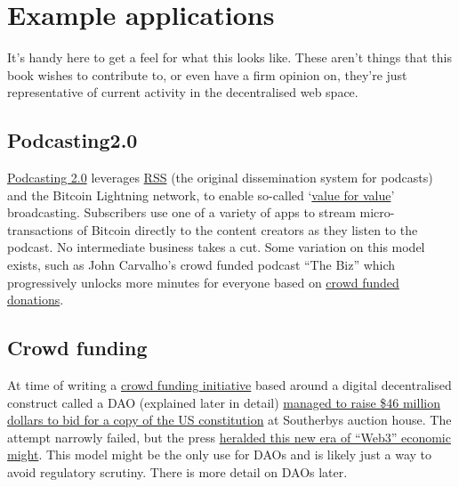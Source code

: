 \section{Example applications}
It's handy here to get a feel for what this looks like. These aren't things that this book wishes to contribute to, or even have a firm opinion on, they're just representative of current activity in the decentralised web space.
\subsection{Podcasting2.0}
\href{https://medium.com/@everywheretrip/an-introduction-to-podcasting-2-0-3c4f61ea17f4}{Podcasting 2.0} leverages \href{https://www.rssboard.org/rss-specification}{RSS} (the original dissemination system for podcasts) and the Bitcoin Lightning network, to enable so-called `\href{https://www.youtube.com/watch?v=NO1aDZ6L4NQ&t=1123s}{value for value}' broadcasting. Subscribers use one of a variety of apps to stream micro-transactions of Bitcoin directly to the content creators as they listen to the podcast. No intermediate business takes a cut. Some variation on this model exists, such as John Carvalho's crowd funded podcast ``The Biz'' which progressively unlocks more minutes for everyone based on \href{https://thebiz.pro/about#crowdwall}{crowd funded donations}.
\subsection{Crowd funding}
At time of writing a \href{https://www.constitutiondao.com/}{crowd funding initiative} based around a digital decentralised construct called a DAO (explained later in detail) \href{https://www.coindesk.com/business/2021/12/06/daos-and-the-next-crowdfunding-gold-rush/}{managed to raise \$46 million dollars to bid for a copy of the US constitution} at Southerbys auction house. The attempt narrowly failed, but the press \href{https://www.coindesk.com/business/2021/12/09/what-kickstarter-going-decentralized-means-for-web-3/}{heralded this new era of ``Web3'' economic might}. This model might be the only use for DAOs and is likely just a way to avoid regulatory scrutiny. There is more detail on DAOs later.
